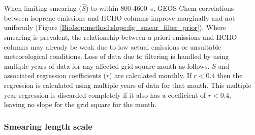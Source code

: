       
      When limiting smearing ($\hat{S}$) to within 800-4600~s, GEOS-Chem correlations between isoprene emissions and HCHO columns improve marginally and not uniformly (Figure \ref{BioIsop:method:slope:fig_smear_filter_prior}). 
      Where smearing is prevalent, the relationship between a priori emissions and HCHO columns may already be weak due to low actual emissions or unsuitable meteorological conditions.
      Loss of data due to filtering is handled by using multiple years of data for any affected grid square month as follows.
      $S$ and associated regression coefficients ($r$) are calculated monthly.
      If $r<0.4$ then the regression is calculated using multiple years of data for that month.
      This multiple year regression is discarded completely if it also has a coefficient of $r<0.4$, leaving no slope for the grid square for the month.
      
    \subsubsection{Smearing length scale}
    
